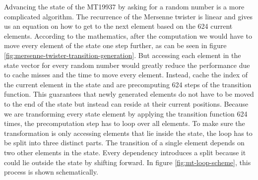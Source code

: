 \documentclass{stdlocal}
\begin{document}
    Advancing the state of the MT19937 by asking for a random number is a more complicated algorithm.
    The recurrence of the Mersenne twister is linear and gives us an equation on how to get to the next element based on the 624 current elements.
    According to the mathematics, after the computation we would have to move every element of the state one step further, as can be seen in figure \ref{fig:mersenne-twister-transition-generation}.
    But accessing each element in the state vector for every random number would greatly reduce the performance due to cache misses and the time to move every element.
    Instead, \citeauthor{matsumoto1998} cache the index of the current element in the state and are precomputing 624 steps of the transition function.
    This guarantees that newly generated elements do not have to be moved to the end of the state but instead can reside at their current positions.
    Because we are transforming every state element by applying the transition function 624 times, the precomputation step has to loop over all elements.
    To make sure the transformation is only accessing elements that lie inside the state, the loop has to be split into three distinct parts.
    The transition of a single element depends on two other elements in the state.
    Every dependency introduces a split because it could lie outside the state by shifting forward.
    In figure \ref{fig:mt-loop-scheme}, this process is shown schematically.
\end{document}
